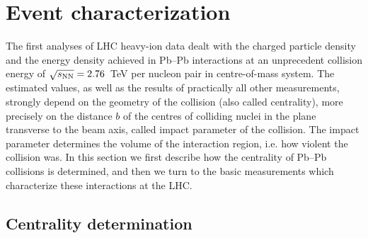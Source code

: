\section{Event characterization}
\label{secks:eventchar}

The first analyses of LHC heavy-ion data dealt with the charged particle density and the energy density achieved in Pb--Pb interactions at an unprecedent collision energy of $\sqrt{s_{\rm NN}} = 2.76$~TeV per nucleon pair in centre-of-mass system. The estimated values, as well as the results of practically all other measurements, strongly depend on the geometry of the collision (also called centrality), more precisely on the distance $b$ of the centres of colliding nuclei in the plane transverse to the beam axis, called impact parameter of the collision. The impact parameter determines the volume of the interaction region, i.e. how violent the collision was.
In this section we first describe how the centrality of Pb--Pb collisions is determined, and then we turn to the basic measurements which characterize these interactions at the LHC.



\subsection{Centrality determination}
\label{subsecks:centrality}

